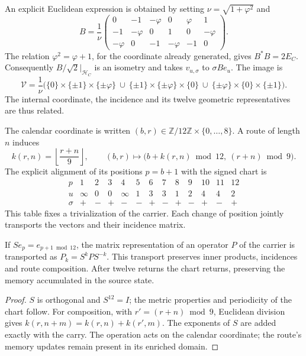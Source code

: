 An explicit Euclidean expression is obtained by setting
\(\nu=\sqrt{1+\varphi^2}\) and
\[
 B=\frac1\nu
 \begin{pmatrix}
 0&-1&-\varphi&0&\varphi&1\\
 -1&-\varphi&0&1&0&-\varphi\\
 -\varphi&0&-1&-\varphi&-1&0
 \end{pmatrix}.
\]
The relation \(\varphi^2=\varphi+1\), for the coordinate already generated,
gives \(B^*B=2E_C\).
Consequently \(B/\sqrt2|_{\mathcal H_C}\) is an isometry and takes
\(v_{u,\sigma}\) to \(\sigma Be_u\). The image is
\[
 \mathcal V=\frac1\nu\bigl(
 \{0\}\times\{\pm1\}\times\{\pm\varphi\}\ \cup\
 \{\pm1\}\times\{\pm\varphi\}\times\{0\}\ \cup\
 \{\pm\varphi\}\times\{0\}\times\{\pm1\}\bigr).
\]
The internal coordinate, the incidence and its
twelve geometric representatives are thus related.

The calendar coordinate is written \((b,r)\in
\mathbb Z/12\mathbb Z\times\{0,\ldots,8\}\). A route of length \(n\)
induces
\[
 k(r,n)=\left\lfloor\frac{r+n}{9}\right\rfloor,\qquad
 (b,r)\longmapsto
 \bigl(b+k(r,n)\bmod12,\ (r+n)\bmod9\bigr).
\]
The explicit alignment of its positions \(p=b+1\) with the signed chart is
\[
\begin{array}{c|rrrrrrrrrrrr}
p&1&2&3&4&5&6&7&8&9&10&11&12\\ \hline
u&\infty&0&0&\infty&1&3&3&1&2&4&4&2\\
\sigma&+&-&+&-&-&+&-&+&-&+&-&+
\end{array}
\]
This table fixes a trivialization of the carrier. Each change of position
jointly transports the vectors and their incidence matrix.

\begin{proposition}
If \(S e_p=e_{p+1\bmod12}\), the matrix representation of an
operator \(P\) of the carrier is transported as \(P_k=S^kPS^{-k}\).
This transport preserves inner products, incidences and route
composition. After twelve returns the chart returns, preserving the memory
accumulated in the source state.
\end{proposition}
\begin{proof}
\(S\) is orthogonal and \(S^{12}=I\); the metric properties
and periodicity of the chart follow. For composition, with
\(r'=(r+n)\bmod9\), Euclidean division gives
\(k(r,n+m)=k(r,n)+k(r',m)\). The exponents of \(S\) are added
exactly with the carry. The operation acts on the calendar
coordinate; the route's memory updates remain
present in its enriched domain.
\end{proof}


